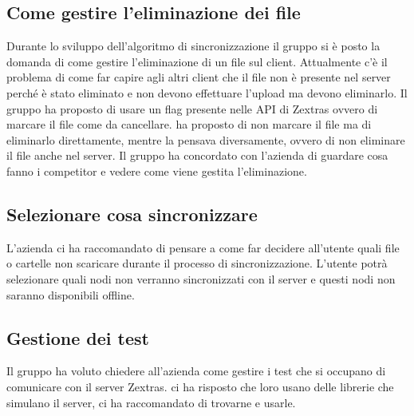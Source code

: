 \subsection{Come gestire l'eliminazione dei file}
Durante lo sviluppo dell'algoritmo di sincronizzazione il gruppo si è posto la domanda di come gestire l'eliminazione di un file sul client. Attualmente c'è il problema di come far capire agli altri client che 
il file non è presente nel server perché è stato eliminato e non devono effettuare l'upload ma devono eliminarlo. Il gruppo ha proposto di usare un flag presente nelle API di Zextras ovvero di marcare il file come 
da cancellare. \Federico{} ha proposto di non marcare il file ma di eliminarlo direttamente, mentre \Alessio{} la pensava diversamente, ovvero di non eliminare il file anche nel server.
Il gruppo ha concordato con l'azienda di guardare cosa fanno i competitor e vedere come viene gestita l'eliminazione.

\subsection{Selezionare cosa sincronizzare}
L'azienda ci ha raccomandato di pensare a come far decidere all'utente quali file o cartelle non scaricare durante il processo di sincronizzazione.
L'utente potrà selezionare quali nodi non verranno sincronizzati con il server e questi nodi non saranno disponibili offline.

\subsection{Gestione dei test}
Il gruppo ha voluto chiedere all'azienda come gestire i test che si occupano di comunicare con il server Zextras. \Alessio{} ci ha risposto che loro usano delle librerie che simulano il server, ci ha raccomandato di trovarne e usarle.

\newpage

